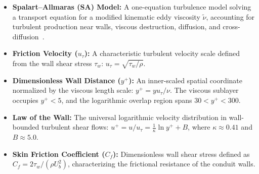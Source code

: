 \documentclass[11pt,a4paper]{article}
\begin{document}
\begin{itemize}[leftmargin=1.5em]
    \item \textbf{Spalart--Allmaras (SA) Model:} A one-equation turbulence model solving a transport equation for a modified kinematic eddy viscosity $\tilde{\nu}$, accounting for turbulent production near walls, viscous destruction, diffusion, and cross-diffusion~\cite[Sec.~2.1, p.~2]{allmaras2012}.
    \item \textbf{Friction Velocity ($u_\tau$):} A characteristic turbulent velocity scale defined from the wall shear stress $\tau_w$: $u_\tau = \sqrt{\tau_w / \rho}$.
    \item \textbf{Dimensionless Wall Distance ($y^+$):} An inner-scaled spatial coordinate normalized by the viscous length scale: $y^+ = y u_\tau / \nu$. The viscous sublayer occupies $y^+ < 5$, and the logarithmic overlap region spans $30 < y^+ < 300$.
    \item \textbf{Law of the Wall:} The universal logarithmic velocity distribution in wall-bounded turbulent shear flows: $u^+ = u / u_\tau = \frac{1}{\kappa} \ln y^+ + B$, where $\kappa \approx 0.41$ and $B \approx 5.0$.
    \item \textbf{Skin Friction Coefficient ($C_f$):} Dimensionless wall shear stress defined as $C_f = 2\tau_w / (\rho U_b^2)$, characterizing the frictional resistance of the conduit walls.
\end{itemize}
\end{document}
